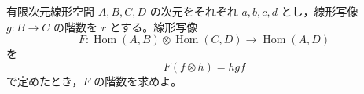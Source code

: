 \documentclass[12pt]{jlreq}
\newcommand{\Hom}{\operatorname{Hom}}
\begin{document}
有限次元線形空間 $A,B,C,D$ の次元をそれぞれ $a,b,c,d$ とし，線形写像 $g:B \to C$ の階数を $r$ とする。線形写像
\[
  F:\Hom(A,B)\otimes \Hom(C,D) \longrightarrow \Hom(A,D)
\]
を
\[
  F(f\otimes h)=hgf
\]
で定めたとき，$F$ の階数を求めよ。
\end{document}
